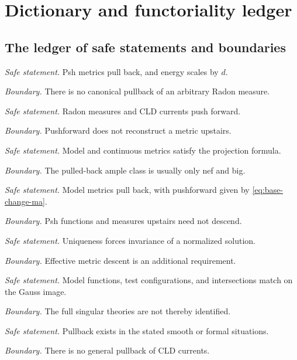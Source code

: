 \section{Dictionary and functoriality ledger}
\label{sec:ch30-ledger}

\subsection{The ledger of safe statements and boundaries}
\label{sec:ch30-ledger-list}

\begin{description}[style=nextline,leftmargin=0pt,labelindent=0pt,
  labelsep=0pt,itemsep=.8\baselineskip,font=\normalfont\bfseries]
\item[Finite pullback]
\emph{Safe statement.} Psh metrics pull back, and energy scales by \(d\).
\par\emph{Boundary.} There is no canonical pullback of an arbitrary Radon
measure.

\item[Proper pushforward]
\emph{Safe statement.} Radon measures and CLD currents push forward.
\par\emph{Boundary.} Pushforward does not reconstruct a metric upstairs.

\item[Birational pullback]
\emph{Safe statement.} Model and continuous metrics satisfy the projection
formula.
\par\emph{Boundary.} The pulled-back ample class is usually only nef and big.

\item[Finite field extension]
\emph{Safe statement.} Model metrics pull back, with pushforward given by
\eqref{eq:base-change-ma}.
\par\emph{Boundary.} Psh functions and measures upstairs need not descend.

\item[Galois descent]
\emph{Safe statement.} Uniqueness forces invariance of a normalized solution.
\par\emph{Boundary.} Effective metric descent is an additional requirement.

\item[Gauss extension]
\emph{Safe statement.} Model functions, test configurations, and
intersections match on the Gauss image.
\par\emph{Boundary.} The full singular theories are not thereby identified.

\item[Current pullback]
\emph{Safe statement.} Pullback exists in the stated smooth or formal
situations.
\par\emph{Boundary.} There is no general pullback of CLD currents.
\end{description}

